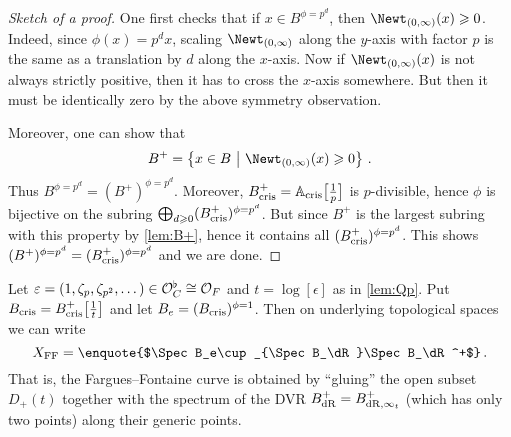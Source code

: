 \begin{proof}[Sketch of a proof]
	One first checks that if $x\in B^{\phi=p^d}$, then $\Newt_{(0,\infty)}(x)\geq 0$. Indeed, since $\phi(x)=p^dx$, scaling $\Newt_{(0,\infty)}$ along the $y$-axis with factor $p$ is the same as a translation by $d$ along the $x$-axis. Now if $\Newt_{(0,\infty)}(x)$ is not always strictly positive, then it has to cross the $x$-axis somewhere. But then it must be identically zero by the above symmetry observation.
	
	Moreover, one can show that
	\begin{equation*}
		B^+=\left\{x\in B\st\Newt_{(0,\infty)}(x)\geq 0\right\}\,.
	\end{equation*}
	Thus $B^{\phi=p^d}=(B^+)^{\phi=p^d}$. Moreover, $B_{\mathrm{cris}}^+=\mathbb{A}_{\mathrm{cris}}\big[\textstyle\frac{1}{p}\big]$ is $p$-divisible, hence $\phi$ is bijective on the subring $\bigoplus_{d\geq 0}(B_\cris^+)^{\smash{\phi=p^d}}$. But since $B^+$ is the largest subring with this property by \cref{lem:B+}, hence it contains all $(B_\cris^+)^{\phi=p^d}$. This shows $(B^+)^{\phi=p^d}=(B_\cris^+)^{\phi=p^d}$ and we are done.
\end{proof}
\begin{rem}
	Let $\varepsilon=(1,\zeta_p,\zeta_{p^2},\dotsc)\in \mathcal{O}_C^\flat\cong \mathcal{O}_F$ and $t=\log{[\epsilon]}$ as in \cref{lem:Qp}. Put $B_{\mathrm{cris}}=B_{\mathrm{cris}}^+\big[\textstyle\frac{1}{t}\big]$ and let $B_e=(B_\cris)^{\phi=1}$. Then on underlying topological spaces we can write
	\begin{equation*}
		X_\FFC=\text{\enquote{$\Spec B_e\cup_{\Spec B_\dR}\Spec B_\dR^+$}}\,.
	\end{equation*}
	That is, the Fargues--Fontaine curve is obtained by \enquote{gluing} the open subset $D_+(t)$ together with the spectrum of the DVR $B_{\mathrm{dR}}^+=B_{\mathrm{dR},\infty_t}^+$ (which has only two points) along their generic points.
\end{rem}